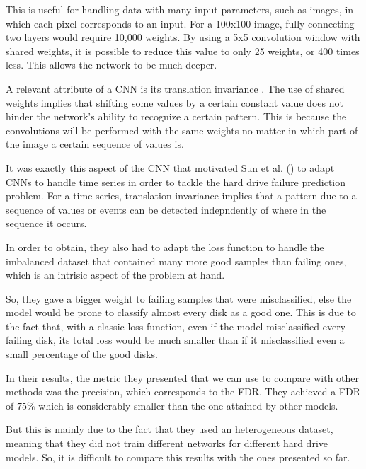 This is useful for handling data with many input parameters, such as images, in which each pixel corresponds to an input.
For a 100x100 image, fully connecting two layers would require 10,000 weights.
By using a 5x5 convolution window with shared weights, it is possible to reduce this value to only 25 weights, or 400 times less.
This allows the network to be much deeper.
 
A relevant attribute of a CNN is its translation invariance \cite{kayhan2020translation}.
The use of shared weights implies that shifting some values by a certain constant value does not hinder the network's ability to recognize a certain pattern.
This is because the convolutions will be performed with the same weights no matter in which part of the image a certain sequence of values is.

It was exactly this aspect of the CNN that motivated Sun et al. (\cite{sun2019system}) to adapt CNNs to handle time series in order to tackle the hard drive failure prediction problem.
For a time-series, translation invariance implies that a pattern due to a sequence of values or events can be detected indepndently of where in the sequence it occurs.

In order to obtain, they also had to adapt the loss function to handle the imbalanced dataset that contained many more good samples than failing ones, which is an intrisic aspect of the problem at hand.

So, they gave a bigger weight to failing samples that were misclassified, else the model would be prone to classify almost every disk as a good one.
This is due to the fact that, with a classic loss function, even if the model misclassified every failing disk, its total loss would be much smaller than if it misclassified even a small percentage of the good disks.

In their results, the metric they presented that we can use to compare with other methods was the precision, which corresponds to the FDR.
They achieved a FDR of $75\%$ which is considerably smaller than the one attained by other models.

But this is mainly due to the fact that they used an heterogeneous dataset, meaning that they did not train different networks for different hard drive models.
So, it is difficult to compare this results with the ones presented so far.